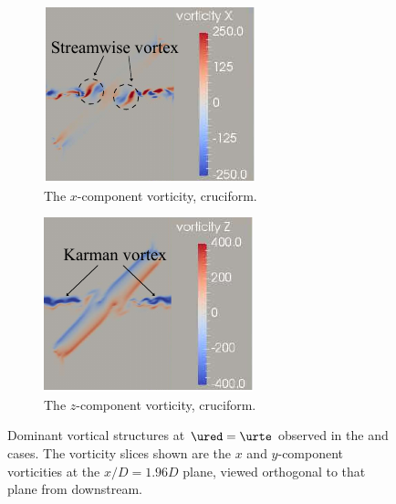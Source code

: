 \documentclass[a4paper,fleqn]{cas-sc}
\begin{document}
\begin{figure}
  \begin{subfigure}[h]{0.28\textwidth}
    \includegraphics[width=\textwidth]{figs/vorx45}
    \caption{The $x$-component vorticity, \angth{} cruciform.}
    \label{fig:vorx45}
  \end{subfigure}
  \hspace{6mm}
  \begin{subfigure}[h]{0.28\textwidth}
    \includegraphics[width=\textwidth]{figs/vorz45}
    \caption{The $z$-component vorticity, \angth{} cruciform.}
    \label{fig:vorz45}
  \end{subfigure}

  \caption{Dominant vortical structures at $\ured = \urte$ observed in the \angfo{} and \angth{} cases. The vorticity slices shown are the $x$ and $y$-component vorticities at the $x/D = 1.96D$ plane, viewed orthogonal to that plane from downstream.} \label{fig:vortStruct67545}
\end{figure}
\end{document}
